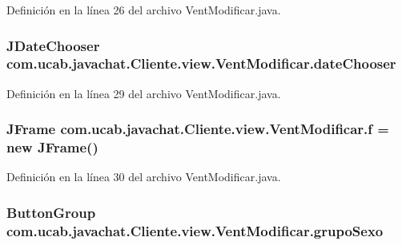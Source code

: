 Definición en la línea 26 del archivo Vent\-Modificar.\-java.

\hypertarget{classcom_1_1ucab_1_1javachat_1_1_cliente_1_1view_1_1_vent_modificar_a569d7c266a6dee345c3b00db14fba73c}{
\subsubsection[{date\-Chooser}]{\setlength{\rightskip}{0pt plus 5cm}J\-Date\-Chooser com.\-ucab.\-javachat.\-Cliente.\-view.\-Vent\-Modificar.\-date\-Chooser}}\label{classcom_1_1ucab_1_1javachat_1_1_cliente_1_1view_1_1_vent_modificar_a569d7c266a6dee345c3b00db14fba73c}


Definición en la línea 29 del archivo Vent\-Modificar.\-java.

\hypertarget{classcom_1_1ucab_1_1javachat_1_1_cliente_1_1view_1_1_vent_modificar_afd0a584cc889ba35215622be0bf91cd1}{
\subsubsection[{f}]{\setlength{\rightskip}{0pt plus 5cm}J\-Frame com.\-ucab.\-javachat.\-Cliente.\-view.\-Vent\-Modificar.\-f = new J\-Frame()}}\label{classcom_1_1ucab_1_1javachat_1_1_cliente_1_1view_1_1_vent_modificar_afd0a584cc889ba35215622be0bf91cd1}


Definición en la línea 30 del archivo Vent\-Modificar.\-java.

\hypertarget{classcom_1_1ucab_1_1javachat_1_1_cliente_1_1view_1_1_vent_modificar_a80a7d37d3c40f61cb047f1216492f401}{
\subsubsection[{grupo\-Sexo}]{\setlength{\rightskip}{0pt plus 5cm}Button\-Group com.\-ucab.\-javachat.\-Cliente.\-view.\-Vent\-Modificar.\-grupo\-Sexo}}\label{classcom_1_1ucab_1_1javachat_1_1_cliente_1_1view_1_1_vent_modificar_a80a7d37d3c40f61cb047f1216492f401}


